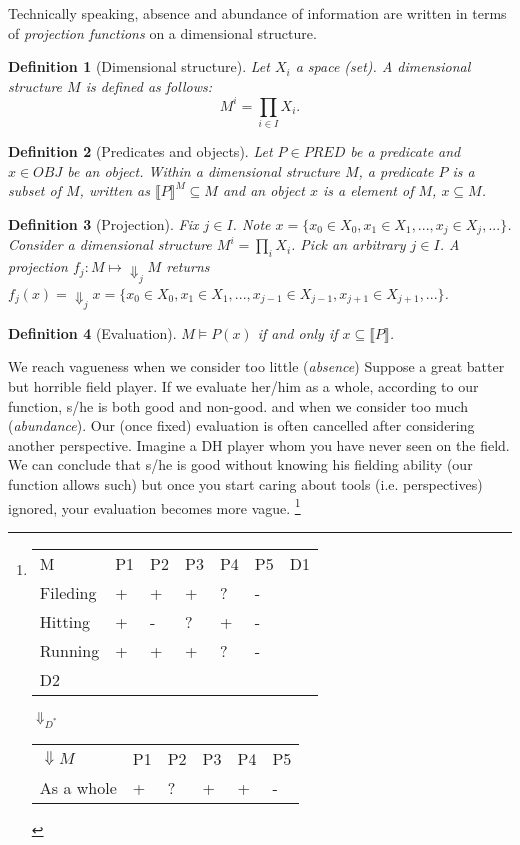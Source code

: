 \documentclass{tufte-handout}
\newtheorem{definition}{Definition}
\begin{document}
Technically speaking, absence and abundance of information are written in terms of \emph{projection functions} on a dimensional structure.

\begin{definition}[Dimensional structure]
Let $X_i$ a space (set).
A dimensional structure $M$ is defined as follows:
\[M^{i} = \prod_{i \in I} X_i.
\]
\end{definition}

\begin{definition}[Predicates and objects]
Let $P \in PRED$ be a predicate and $x \in OBJ$ be an object.
Within a dimensional structure $M$,
a predicate $P$ is a subset of $M$, written as $\llbracket P \rrbracket^{M} \subseteq M$ and an object $x$ is a element of $M$, $x \subseteq M$.
\end{definition}

\begin{definition}[Projection]
Fix $j \in I$. Note $x = \{x_0 \in X_0, x_1 \in X_1, ... , x_j \in X_j, ...\}$.
Consider a dimensional structure $M^{i} = \prod_i X_i$.
Pick an arbitrary $j \in I$.
A projection $f_j: M \mapsto \Downarrow_j M$ returns $f_{j}(x)= \Downarrow_{j}x = \{x_0 \in X_0, x_1 \in X_1, ... , x_{j-1} \in X_{j-1}, x_{j+1} \in X_{j+1}, ...\}$.
\end{definition}

\begin{definition}[Evaluation]
$M \models P(x)$ if and only if $x \subseteq \llbracket P \rrbracket$.
\end{definition}

We reach vagueness when we consider too little (\emph{absence})
Suppose a great batter but horrible field player. If we evaluate her/him as a whole, according to our function, s/he is both good and non-good.
 and when we consider too much (\emph{abundance}).
Our (once fixed) evaluation is often cancelled after considering another perspective. Imagine a DH player whom you have never seen on the field. We can conclude that s/he is good without knowing his fielding ability (our function allows such) but once you start caring about tools (i.e. perspectives) ignored, your evaluation becomes more vague.
\footnote{
\begin{tabular}{lllllll}
M        & P1 & P2 & P3 & P4 & P5 & D1  \\
Fileding & +  & +  & +  & ?  & -  &     \\
Hitting  & +  & -  & ?  & +  & -  &     \\
Running  & +  & +  & +  & ?  & -  &     \\
D2       &    &    &    &    &    &
\end{tabular}

{\Large $\Downarrow_{D^*}$}

\begin{tabular}{llllll}
$\Downarrow M$ & P1 & P2 & P3 & P4 & P5  \\
As a whole                  & +  & ?  & +  & +  & -
\end{tabular}

}
\end{document}
